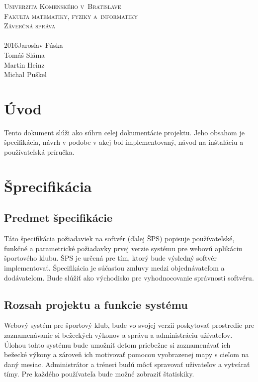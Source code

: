 \documentclass[12pt,a4paper]{report}
\theoremstyle{definition}
\theoremstyle{remark}
\begin{document}
%

\def\nazov{Záverčná správa}
\def\autorJ{Jaroslav Fúska }
\def\autorT{Tomáš Sláma }
\def\autorH{ Martin Heinz }
\def\autorM{Michal Puškel }
\def\fakulta{Fakulta matematiky, fyziky a~informatiky}
\def\univerzita{Univerzita Komenského v~Bratislave}
\def\mesto{Bratislava}
\def\typprace{Športový klub}
\def\rok{2016}
\thispagestyle{empty}
\begin{center}
\textsc{\LARGE\univerzita}\\
\bigskip\textsc{\LARGE\fakulta}\\
\vfill\textsc{\Huge\nazov}\\
\medskip{\Large\typprace}\\
\vfill{\large\rok\hfill\autorJ\\ \hfill\autorT \\ \hfill \autorH \\ \hfill \autorM}
\end{center}

\tableofcontents

\chapter{Úvod}

Tento dokument slúži ako súhrn celej dokumentácie projektu. Jeho obsahom je špecifikácia, návrh v podobe v akej bol implementovaný, návod na inštaláciu a používateľská príručka.

\chapter{Šprecifikácia}
\section{Predmet špecifikácie}
Táto špecifikácia požiadaviek na softvér (ďalej ŠPS) popisuje používateľské, funkčné a parametrické požiadavky prvej verzie systému pre webovú aplikáciu športového klubu. ŠPS je určená pre tím, ktorý bude výsledný   softvér   implementovať.  Špecifikácia   je   súčasťou   zmluvy   medzi   objednávateľom a dodávateľom.  Bude slúžiť ako  východisko  pre vyhodnocovanie správnosti softvéru.

\section{Rozsah projektu a funkcie systému}
Webový systém pre športový klub, bude vo svojej verzii poskytovať prostredie pre zaznamenávanie si bežeckých výkonov a správu a administráciu užívateľov. Úlohou tohto systému bude umožniť deťom priebežne si zaznamenávať ich bežecké výkony a zároveň ich motivovať pomocou vyobrazenej mapy s cieľom na daný mesiac. Administrátor a tréneri budú môcť spravovať uživateľov a vytvárať tímy. Pre každého používateľa bude možné zobraziť štatiskiky.
\end{document}

